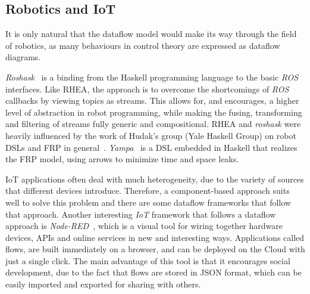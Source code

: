\documentclass[sigplan,screen,review,anonymous]{acmart}
\begin{document}
\subsection{Robotics and IoT}

It is only natural that the dataflow model would make its way through the field
of robotics, as many behaviours in control theory are expressed as dataflow
diagrams.

\textit{Roshask}~\cite{roshask} is a binding from the Haskell programming language
to the basic \textit{ROS} interfaces. Like \textsc{RHEA}, the approach is to
overcome the shortcomings of \textit{ROS} callbacks by viewing topics as
streams. This allows for, and encourages, a higher level of abstraction in
robot programming, while making the fusing, transforming and filtering of
streams fully generic and compositional.
\textsc{RHEA} and \textit{roshask} were heavily influenced by the work of Hudak's
group (Yale Haskell Group) on robot DSLs and FRP in general~\cite{fran,arrows_robots,lambda_in_motion}.
\textit{Yampa}~\cite{arrows_robots} is a DSL embedded in Haskell
that realizes the FRP model, using arrows to minimize time and space leaks.


IoT applications often deal with much heterogeneity, due to the variety of
sources that different devices introduce. Therefore, a component-based approach
suits well to solve this problem and there are some dataflow frameworks that
follow that approach.
Another interesting \textit{IoT} framework that follows a dataflow
approach is \textit{Node-RED}~\cite{iot_dataflow}, which is a visual tool for wiring
together hardware devices, APIs and online services in new and interesting ways.
Applications called flows, are built immediately on a browser, and can be
deployed on the Cloud with just a single click. The main advantage of this tool
is that it encourages social development, due to the fact that flows are stored
in JSON format, which can be easily imported and exported for sharing with
others.
\end{document}
